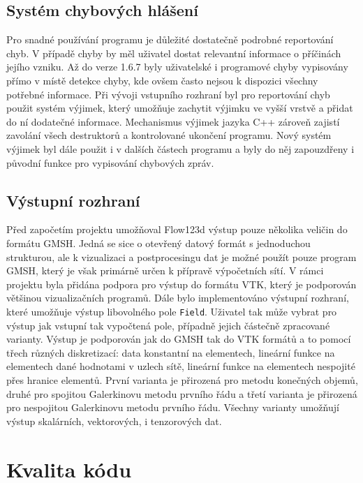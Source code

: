 \documentclass[11pt]{report}
\begin{document}
\subsection{Systém chybových hlášení}
Pro snadné používání programu je důležité dostatečně podrobné 
reportování chyb. V případě chyby by měl uživatel dostat relevantní 
informace o příčinách jejího vzniku. 
Až do verze 1.6.7 byly uživatelské i programové chyby vypisovány přímo v místě 
detekce chyby, kde ovšem často nejsou k dispozici všechny potřebné informace. 
Při vývoji vstupního rozhraní byl pro reportování chyb použit systém výjimek, 
který umožňuje zachytit výjimku ve vyšší vrstvě a přidat do ní dodatečné 
informace. Mechanismus výjimek jazyka C++ zároveň zajistí zavolání všech 
destruktorů a kontrolované ukončení programu.
Nový systém výjimek byl dále použit i v dalších částech 
programu a byly do něj zapouzdřeny i původní funkce pro vypisování chybových 
zpráv. 

\subsection{Výstupní rozhraní}
Před započetím projektu umožňoval Flow123d výstup pouze několika veličin do 
formátu GMSH. Jedná se sice o otevřený datový formát s jednoduchou strukturou, 
ale k vizualizaci a postprocesingu dat je možné použít pouze program GMSH, 
který je však primárně určen k přípravě výpočetních sítí. V rámci projektu byla 
přidána podpora pro výstup do formátu VTK, který je podporován většinou 
vizualizačních programů. Dále bylo implementováno výstupní rozhraní, které 
umožňuje výstup libovolného pole \verb'Field'. Uživatel tak může vybrat pro 
výstup jak vstupní tak vypočtená pole, případně jejich částečně zpracované 
varianty. Výstup je podporován jak do GMSH tak do VTK formátů a to pomocí třech 
různých diskretizací: data konstantní na elementech, lineární funkce na 
elementech dané hodnotami v uzlech sítě, lineární funkce na elementech 
nespojité přes hranice elementů. První varianta je přirozená pro metodu 
konečných objemů, druhé pro spojitou Galerkinovu  metodu prvního řádu a 
třetí varianta je přirozená pro nespojitou Galerkinovu metodu prvního 
řádu. Všechny varianty umožňují výstup skalárních, vektorových, i tenzorových 
dat.

\section{Kvalita kódu}
\end{document}
